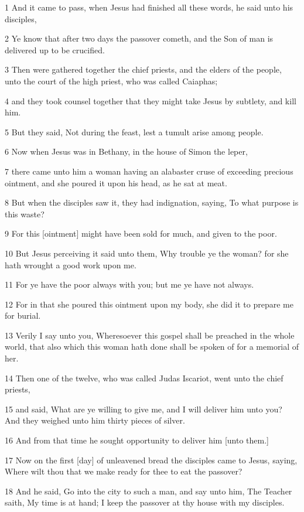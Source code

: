 \par 1 And it came to pass, when Jesus had finished all these words, he said unto his disciples,
\par 2 Ye know that after two days the passover cometh, and the Son of man is delivered up to be crucified.
\par 3 Then were gathered together the chief priests, and the elders of the people, unto the court of the high priest, who was called Caiaphas;
\par 4 and they took counsel together that they might take Jesus by subtlety, and kill him.
\par 5 But they said, Not during the feast, lest a tumult arise among people.
\par 6 Now when Jesus was in Bethany, in the house of Simon the leper,
\par 7 there came unto him a woman having an alabaster cruse of exceeding precious ointment, and she poured it upon his head, as he sat at meat.
\par 8 But when the disciples saw it, they had indignation, saying, To what purpose is this waste?
\par 9 For this [ointment] might have been sold for much, and given to the poor.
\par 10 But Jesus perceiving it said unto them, Why trouble ye the woman? for she hath wrought a good work upon me.
\par 11 For ye have the poor always with you; but me ye have not always.
\par 12 For in that she poured this ointment upon my body, she did it to prepare me for burial.
\par 13 Verily I say unto you, Wheresoever this gospel shall be preached in the whole world, that also which this woman hath done shall be spoken of for a memorial of her.
\par 14 Then one of the twelve, who was called Judas Iscariot, went unto the chief priests,
\par 15 and said, What are ye willing to give me, and I will deliver him unto you? And they weighed unto him thirty pieces of silver.
\par 16 And from that time he sought opportunity to deliver him [unto them.]
\par 17 Now on the first [day] of unleavened bread the disciples came to Jesus, saying, Where wilt thou that we make ready for thee to eat the passover?
\par 18 And he said, Go into the city to such a man, and say unto him, The Teacher saith, My time is at hand; I keep the passover at thy house with my disciples.
